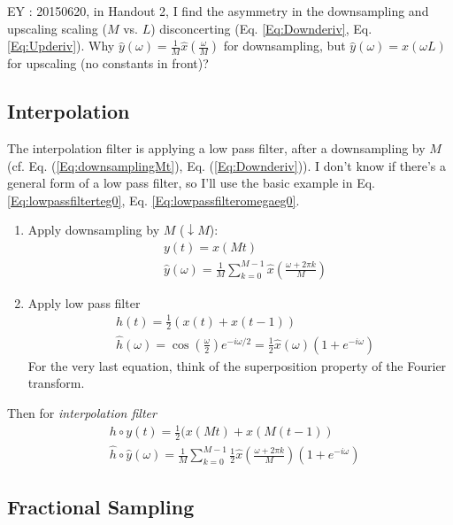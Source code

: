 \documentclass[twoside]{amsart}
\theoremstyle{plain}
\theoremstyle{definition}
\theoremstyle{remark}
\numberwithin{equation}{section}
\begin{document}
EY : 20150620, in Handout 2, I find the asymmetry in the downsampling and upscaling scaling ($M$ vs. $L$) disconcerting (Eq. \ref{Eq:Downderiv},  Eq. \ref{Eq:Upderiv}).  Why $\widehat{y}(\omega) = \frac{1}{M}\widehat{x}(\frac{\omega}{M})$ for downsampling, but $\widehat{y}(\omega) = \widehat{x}(\omega L)$ for upscaling (no constants in front)?


\subsection*{Interpolation} 

The interpolation filter is applying a low pass filter, after a downsampling by $M$ (cf. Eq. (\ref{Eq:downsamplingMt}), Eq. (\ref{Eq:Downderiv})).  I don't know if there's a general form of a low pass filter, so I'll use the basic example in Eq. \ref{Eq:lowpassfilterteg0}, Eq. \ref{Eq:lowpassfilteromegaeg0}.  

\begin{enumerate}
  \item Apply downsampling by $M$ ($\downarrow M$): 
\[
\begin{aligned}
  & y(t) = x(Mt) \\ 
  & \widehat{y}(\omega) = \frac{1}{M} \sum_{k=0}^{M-1} \widehat{x}\left( \frac{\omega  +2\pi k }{M} \right) 
\end{aligned}
\]
  \item Apply low pass filter
\[
\begin{aligned}
  & h(t) = \frac{1}{2} ( x(t) + x(t-1)) \\
  & \widehat{h}(\omega) = \cos{\left( \frac{\omega}{2} \right) } e^{-i \omega/2} = \frac{1}{2} \widehat{x}(\omega)( 1 + e^{-i\omega})
\end{aligned}
\]
For the very last equation, think of the superposition property of the Fourier transform.  
\end{enumerate}

Then for \emph{interpolation filter} \[
\begin{aligned}
  & h\circ y(t) = \frac{1}{2} (x(Mt) + x(M(t-1)) \\ 
  & \widehat{h} \circ \widehat{y}(\omega) = \frac{1}{M} \sum_{k=0}^{M-1} \frac{1}{2}\widehat{x}\left( \frac{\omega + 2\pi k }{M} \right) (1 + e^{-i \omega })
\end{aligned}
\]


\subsection*{Fractional Sampling}
\end{document}
